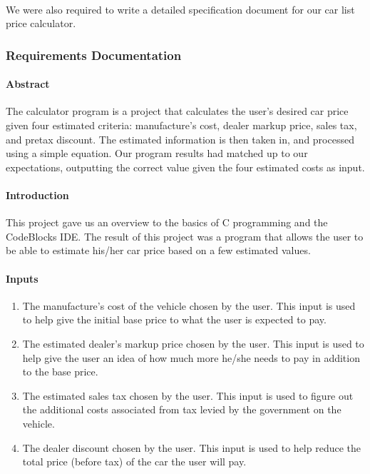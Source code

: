 \documentclass{article}
\begin{document}
	\paragraph{} We were also required to write a detailed specification document for our car list price calculator.

	\subsubsection{Requirements Documentation}
		\paragraph{Abstract} The calculator program is a project that calculates the user’s desired car price given four estimated criteria: manufacture’s cost, dealer markup price, sales tax, and pretax discount. The estimated information is then taken in, and processed using a simple equation.  Our program results had matched up to our expectations, outputting the correct value given the four estimated costs as input.

		\paragraph{Introduction} This project gave us an overview to the basics of C programming and the CodeBlocks IDE. The result of this project was a program that allows the user to be able to estimate his/her car price based on a few estimated values. 

		\paragraph{Inputs}
		\begin{enumerate}
			\item The manufacture’s cost of the vehicle chosen by the user. This input is used to help give the initial base price to what the user is expected to pay.
			\item The estimated dealer’s markup price chosen by the user. This input is used to help give the user an idea of how much more he/she needs to pay in addition to the base price.
			\item The estimated sales tax chosen by the user. This input is used to figure out the additional costs associated from tax levied by the government on the vehicle.
			\item The dealer discount chosen by the user. This input is used to help reduce the total price (before tax) of the car the user will pay.
		\end{enumerate}
\end{document}
